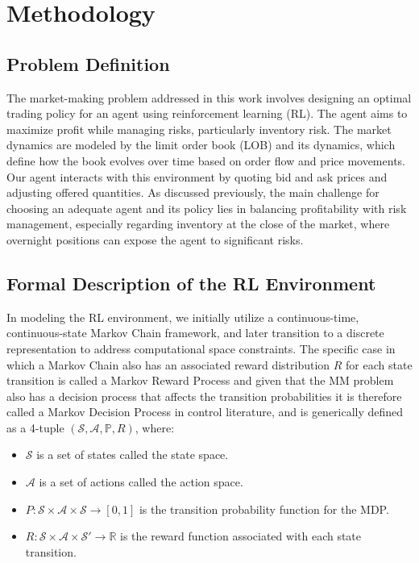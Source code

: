 \section{Methodology}

\subsection{Problem Definition}
The market-making problem addressed in this work involves designing an optimal trading policy for an agent using reinforcement learning (RL). The agent aims to maximize profit while managing risks, particularly inventory risk. The market dynamics are modeled by the limit order book (LOB) and its dynamics, which define how the book evolves over time based on order flow and price movements. Our agent interacts with this environment by quoting bid and ask prices and adjusting offered quantities. As discussed previously, the main challenge for choosing an adequate agent and its policy lies in balancing profitability with risk management, especially regarding inventory at the close of the market, where overnight positions can expose the agent to significant risks.

\subsection{Formal Description of the RL Environment} In modeling the RL environment, we initially utilize a continuous-time, continuous-state Markov Chain framework, and later transition to a discrete representation to address computational space constraints. 
The specific case in which a Markov Chain also has an associated reward distribution $R$ for each state transition is called a Markov Reward Process and given that the MM problem also has a decision process that affects the transition probabilities it is therefore called a Markov Decision Process in control literature, and is generically defined as a 4-tuple $ (\mathcal{S}, \mathcal{A}, \mathbb{P}, R) $, where:

\begin{itemize}
	\item $\mathcal{S}$ is a set of states called the state space.
	\item $\mathcal{A}$ is a set of actions called the action space.
	\item $P: \mathcal{S} \times \mathcal{A} \times \mathcal{S} \to [0, 1]$ is the transition probability function for the MDP.
	\item $R: \mathcal{S} \times \mathcal{A} \times \mathcal{S}' \rightarrow \mathbb{R}$ is the reward function associated with each state transition.
\end{itemize}

